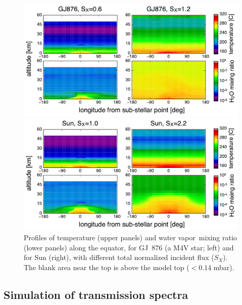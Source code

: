 \documentclass[11pt,numberedappendix,twocolappendix,]{emulateapj}
\newcommand{\wv}{water vapor\ }
\begin{document}
\begin{figure}[tb]
    \begin{minipage}{0.5\hsize}
\includegraphics[width=\hsize]{fig/AqOH0TLS_GJ876_temp_xH2O.pdf}
    \end{minipage}
    \begin{minipage}{0.5\hsize}
\includegraphics[width=\hsize]{fig/AqOH0TLS_Sun_temp_xH2O.pdf}
    \end{minipage}
    \caption{Profiles of temperature (upper panels) and \wv mixing ratio (lower panels) along the equator, for GJ~876 (a M4V star; left) and for Sun (right), with different total normalized incident flux ($S_X$). The blank area near the top is above the model top ($< 0.14$ mbar).}
\label{fig:3Dprofile_equator}
\end{figure}


\subsection{Simulation of transmission spectra}
\label{ss:method_TransmissionSpectra}
\end{document}
